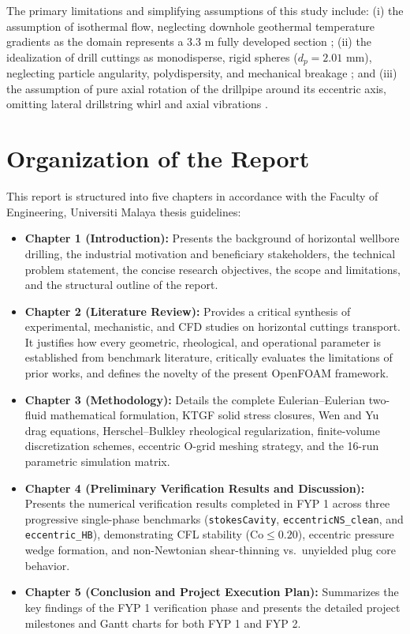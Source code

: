 The primary limitations and simplifying assumptions of this study include: (i) the assumption of isothermal flow, neglecting downhole geothermal temperature gradients as the domain represents a $3.3\text{ m}$ fully developed section \citep{Hajipour2020}; (ii) the idealization of drill cuttings as monodisperse, rigid spheres ($d_p = 2.01\text{ mm}$), neglecting particle angularity, polydispersity, and mechanical breakage \citep{Li2026}; and (iii) the assumption of pure axial rotation of the drillpipe around its eccentric axis, omitting lateral drillstring whirl and axial vibrations \citep{Saad2024}.

\section{Organization of the Report}
This report is structured into five chapters in accordance with the Faculty of Engineering, Universiti Malaya thesis guidelines:
\begin{itemize}
    \item \textbf{Chapter 1 (Introduction):} Presents the background of horizontal wellbore drilling, the industrial motivation and beneficiary stakeholders, the technical problem statement, the concise research objectives, the scope and limitations, and the structural outline of the report.
    \item \textbf{Chapter 2 (Literature Review):} Provides a critical synthesis of experimental, mechanistic, and CFD studies on horizontal cuttings transport. It justifies how every geometric, rheological, and operational parameter is established from benchmark literature, critically evaluates the limitations of prior works, and defines the novelty of the present OpenFOAM framework.
    \item \textbf{Chapter 3 (Methodology):} Details the complete Eulerian--Eulerian two-fluid mathematical formulation, KTGF solid stress closures, Wen and Yu drag equations, Herschel--Bulkley rheological regularization, finite-volume discretization schemes, eccentric O-grid meshing strategy, and the 16-run parametric simulation matrix.
    \item \textbf{Chapter 4 (Preliminary Verification Results and Discussion):} Presents the numerical verification results completed in FYP 1 across three progressive single-phase benchmarks (\texttt{stokesCavity}, \texttt{eccentricNS\_clean}, and \texttt{eccentric\_HB}), demonstrating CFL stability ($\text{Co} \le 0.20$), eccentric pressure wedge formation, and non-Newtonian shear-thinning vs.\ unyielded plug core behavior.
    \item \textbf{Chapter 5 (Conclusion and Project Execution Plan):} Summarizes the key findings of the FYP 1 verification phase and presents the detailed project milestones and Gantt charts for both FYP 1 and FYP 2.
\end{itemize}